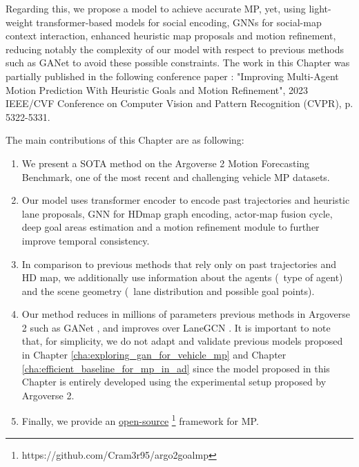 Regarding this, we propose a model \cite{gomez2023improving} to achieve accurate \ac{MP}, yet, using light-weight transformer-based models for social encoding, \acp{GNN} for social-map context interaction, enhanced heuristic map proposals and motion refinement, reducing notably the complexity of our model with respect to previous methods such as GANet \cite{wang2022ganet} to avoid these possible constraints. The work in this Chapter was partially published in the following conference paper \cite{gomez2023improving}: "Improving Multi-Agent Motion Prediction With Heuristic Goals and Motion Refinement", 2023 IEEE/CVF Conference on Computer Vision and Pattern Recognition (CVPR), p. 5322-5331. 

The main contributions of this Chapter are as following: 

\begin{enumerate}
	
	\item We present a \ac{SOTA} method on the Argoverse 2 Motion Forecasting Benchmark, one of the most recent and challenging vehicle \ac{MP} datasets.
	
	\item Our model uses transformer encoder to encode past trajectories and heuristic lane proposals, \ac{GNN} for \ac{HDmap} graph encoding, actor-map fusion cycle, deep goal areas estimation and a motion refinement module to further improve temporal consistency.
	
	\item In comparison to previous methods that rely only on past trajectories and HD map, we additionally use information about the agents (\eg \ type of agent) and the scene geometry (\eg \ lane distribution and possible goal points).
	
	\item Our method reduces in millions of parameters previous methods in Argoverse 2 such as GANet \cite{wang2022ganet}, and improves over LaneGCN \cite{liang2020learning}. It is important to note that, for simplicity, we do not adapt and validate previous models proposed in Chapter \ref{cha:exploring_gan_for_vehicle_mp} and Chapter \ref{cha:efficient_baseline_for_mp_in_ad} since the model proposed in this Chapter is entirely developed using the experimental setup proposed by Argoverse 2. 
	
	\item Finally, we provide an \href{https://github.com/Cram3r95/argo2goalmp}{open-source} \footnote{https://github.com/Cram3r95/argo2goalmp} framework for \ac{MP}.
	
\end{enumerate}

